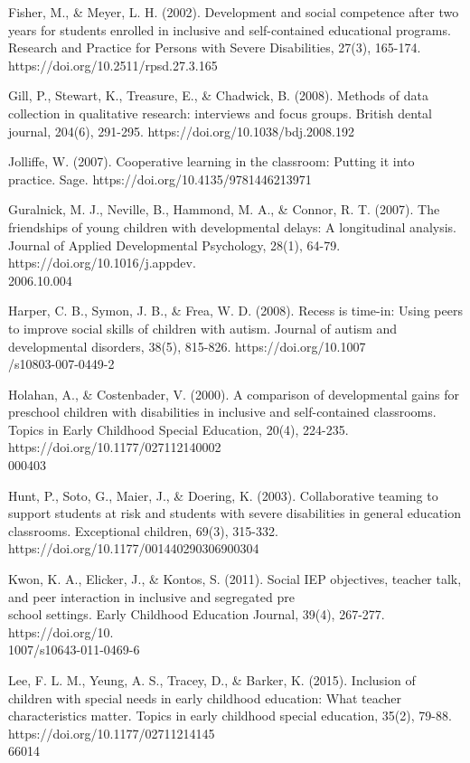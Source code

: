 \documentclass[11pt]{sig-alternate}
\begin{document}
\begin{large}
{Fisher, M., \& Meyer, L. H. (2002). Development and social competence after two years for students enrolled in inclusive and self-contained educational programs. Research and Practice for Persons with Severe Disabilities, 27(3), 165-174.‏ \\https://doi.org/10.2511/rpsd.27.3.165 

Gill, P., Stewart, K., Treasure, E., \& Chadwick, B. (2008). Methods of data collection in qualitative research: interviews and focus groups. British dental journal, 204(6), 291-295.‏ https://doi.org/10.1038/bdj.2008.192 

Jolliffe, W. (2007). Cooperative learning in the classroom: Putting it into practice. Sage.‏ https://doi.org/10.4135/9781446213971 

Guralnick, M. J., Neville, B., Hammond, M. A., \& Connor, R. T. (2007). The friendships of young children with developmental delays: A longitudinal analysis. Journal of Applied Developmental Psychology, 28(1), 64-79.‏ https://doi.org/10.1016/j.appdev.\\2006.10.004 

Harper, C. B., Symon, J. B., \& Frea, W. D. (2008). Recess is time-in: Using peers to improve social skills of children with autism. Journal of autism and developmental disorders, 38(5), 815-826.‏ https://doi.org/10.1007\\/s10803-007-0449-2 

Holahan, A., & Costenbader, V. (2000). A comparison of developmental gains for preschool children with disabilities in inclusive and self-contained classrooms. Topics in Early Childhood Special Education, 20(4), 224-235.‏ https://doi.org/10.1177/027112140002\\000403

Hunt, P., Soto, G., Maier, J., \& Doering, K. (2003). Collaborative teaming to support students at risk and students with severe disabilities in general education classrooms. Exceptional children, 69(3), 315-332.‏ \\https://doi.org/10.1177/001440290306900304 

Kwon, K. A., Elicker, J., \& Kontos, S. (2011). Social IEP objectives, teacher talk, and peer interaction in inclusive and segregated pre\\school settings. Early Childhood Education Journal, 39(4), 267-277.‏ https://doi.org/10.\\1007/s10643-011-0469-6 

Lee, F. L. M., Yeung, A. S., Tracey, D., \& Barker, K. (2015). Inclusion of children with special needs in early childhood education: What teacher characteristics matter. Topics in early childhood special education, 35(2), 79-88.‏ https://doi.org/10.1177/02711214145\\66014

}
\end{large}
\end{document}
